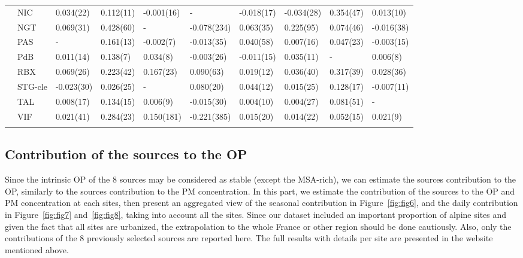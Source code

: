 \documentclass[acp]{copernicus}
\begin{document}
\begin{table}
\begin{tabular}{llllllllll}
                 & NIC                          & 0.034(22)   & 0.112(11)  & -0.001(16) & -           & -0.018(17) & -0.034(28)  & 0.354(47)  & 0.013(10)\\
                 & NGT                          & 0.069(31)   & 0.428(60)  & -          & -0.078(234) & 0.063(35)  & 0.225(95)   & 0.074(46)  & -0.016(38)\\
                 & PAS                          & -           & 0.161(13)  & -0.002(7)  & -0.013(35)  & 0.040(58)  & 0.007(16)   & 0.047(23)  & -0.003(15)\\
                 & PdB                          & 0.011(14)   & 0.138(7)   & 0.034(8)   & -0.003(26)  & -0.011(15) & 0.035(11)   & -          & 0.006(8)\\
                 & RBX                          & 0.069(26)   & 0.223(42)  & 0.167(23)  & 0.090(63)   & 0.019(12)  & 0.036(40)   & 0.317(39)  & 0.028(36)\\
                 & STG-cle                      & -0.023(30)  & 0.026(25)  & -          & 0.080(20)   & 0.044(12)  & 0.015(25)   & 0.128(17)  & -0.007(11)\\
                 & TAL                          & 0.008(17)   & 0.134(15)  & 0.006(9)   & -0.015(30)  & 0.004(10)  & 0.004(27)   & 0.081(51)  & -\\
                 & VIF                          & 0.021(41)   & 0.284(23)  & 0.150(181) & -0.221(385) & 0.015(20)  & 0.014(22)   & 0.052(15)  & 0.021(9)\\
\bottomhline
    \end{tabular}
\end{table}

\subsection{Contribution of the sources to the OP}%
\label{contribution-of-the-sources-to-the-op-1}

Since the intrinsic OP of the 8 sources may be considered as stable
(except the MSA-rich), we can estimate the sources contribution to the
OP, similarly to the sources contribution to the PM concentration. In
this part, we estimate the contribution of the sources to the OP and PM
concentration at each sites, then present an aggregated view of the
seasonal contribution in Figure~\ref{fig:fig6}, and the daily contribution in
Figure~\ref{fig:fig7} and~\ref{fig:fig8}, taking into account all the sites. Since our dataset included
an important proportion of alpine sites and given the fact that all
sites are urbanized, the extrapolation to the whole France or other
region should be done cautiously. Also, only the contributions of the 8
previously selected sources are reported here. The full results with
details per site are presented in the website mentioned above.
\end{document}
